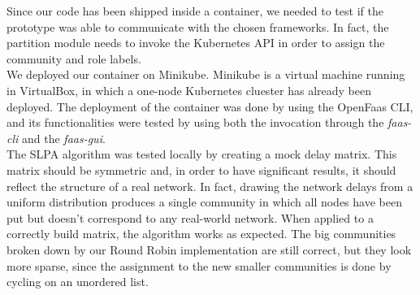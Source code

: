 Since our code has been shipped inside a container, we needed to test if the prototype
was able to communicate with the chosen frameworks. In fact, the partition module  needs to invoke the Kubernetes API
in order to assign the community and role labels.
\\
We deployed our container on Minikube. Minikube is a virtual machine running in VirtualBox, in which a
one-node Kubernetes cluester has already been deployed. The deployment of the container 
was done by using the OpenFaas CLI, and its functionalities were tested by using both the invocation
through the \textit{faas-cli} and the \textit{faas-gui}.
\\
The SLPA algorithm was tested locally by creating a mock delay matrix. This matrix should be symmetric and, 
in order to have significant results, it should reflect the structure of a real network. In fact, drawing the network
delays from a uniform distribution produces a single community in which all nodes have been put but doesn't correspond
to any real-world network.
When applied to a correctly build matrix, the algorithm works as expected. The big communities broken down by our Round Robin 
implementation are still correct, but they look more sparse, since the assignment to the new smaller communities is done by
cycling on an unordered list.
